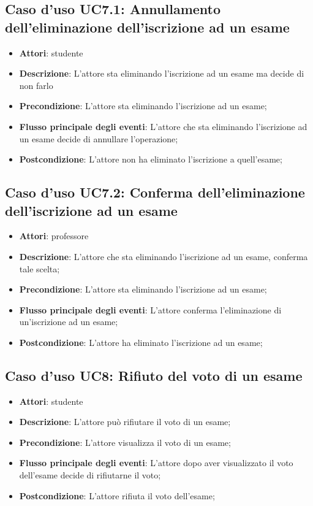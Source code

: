 \subsection{Caso d'uso \texorpdfstring{UC7.1}{UC7.1}: Annullamento dell'eliminazione dell'iscrizione ad un esame}
\begin{itemize}
\item \textbf{Attori}: studente
\item \textbf{Descrizione}: L'attore sta eliminando l'iscrizione ad un esame ma decide di non farlo
\item \textbf{Precondizione}: L'attore sta eliminando l'iscrizione ad un esame;
\item \textbf{Flusso principale degli eventi}: L'attore che sta eliminando l'iscrizione ad un esame decide di annullare l'operazione;
\item \textbf{Postcondizione}: L'attore non ha eliminato l'iscrizione a quell'esame;
\end{itemize}
\subsection{Caso d'uso \texorpdfstring{UC7.2}{UC7.2}: Conferma dell'eliminazione dell'iscrizione ad un esame}
\begin{itemize}
\item \textbf{Attori}: professore
\item \textbf{Descrizione}: L'attore che sta eliminando l'iscrizione ad un esame, conferma tale scelta;
\item \textbf{Precondizione}: L'attore sta eliminando l'iscrizione ad un esame;
\item \textbf{Flusso principale degli eventi}: L'attore conferma l'eliminazione di un'iscrizione ad un esame;
\item \textbf{Postcondizione}: L'attore ha eliminato l'iscrizione ad un esame;
\end{itemize}
\subsection{Caso d'uso \texorpdfstring{UC8}{UC8}: Rifiuto del voto di un esame}
\begin{itemize}
\item \textbf{Attori}: studente
\item \textbf{Descrizione}: L'attore può rifiutare il voto di un esame;
\item \textbf{Precondizione}: L'attore visualizza il voto di un esame;
\item \textbf{Flusso principale degli eventi}: L'attore dopo aver visualizzato il voto dell'esame decide di rifiutarne il voto;
\item \textbf{Postcondizione}: L'attore rifiuta il voto dell'esame;
\end{itemize}
